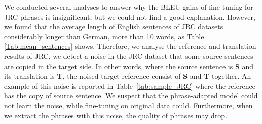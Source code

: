We conducted several analyses to answer why the BLEU gains of fine-tuning for JRC phrases is insignificant, but we could not find a good explanation. However, we found that the average length of English sentences of JRC datasets considerably longer than German, more than 10 words, as Table \ref{Tab:mean_sentences} shows. Therefore, we analyse the reference and translation results of JRC, we detect a noise in the JRC dataset that some source sentences are copied in the target side.
In other words, where the source sentence is \textbf{S} and its translation is \textbf{T}, the noised target reference consist of \textbf{S} and \textbf{T} together. An example of this noise is reported in Table~\ref{tab:sample_JRC} where the reference has the copy of source sentence. We suspect that the phrase-adapted model could not learn the noise, while fine-tuning on original data could. Furthermore, when we extract the phrases with this noise, the quality of phrases may drop. 

